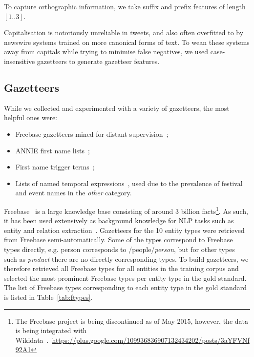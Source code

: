 \documentclass[11pt|a4paper]{article}
\begin{document}
To capture orthographic information, we take suffix and prefix features of length $[1..3]$.

Capitalisation is notoriously unreliable in tweets, and also often overfitted to by newswire systems trained on more canonical forms of text.
To wean these systems away from capitals while trying to minimise false negatives, we used case-insensitive gazetteers to generate gazetteer features.

\subsection{Gazetteers}
While we collected and experimented with a variety of gazetteers, the most helpful ones were:

\begin{itemize}
\item Freebase gazetteers mined for distant supervision~\cite{augenstein2014relation};
\item ANNIE first name lists~\cite{Cun02b-short};
\item First name trigger terms~\cite{derczynski2014passive};
\item Lists of named temporal expressions~\cite{brucato2013recognising}, used due to the prevalence of festival and event names in the {\em other} category.
\end{itemize}

Freebase~\cite{bollacker2008freebase} is a large knowledge base consisting of around 3 billion facts\footnote{The Freebase project is being discontinued as of May 2015, however, the data is being integrated with Wikidata~\cite{wikidata2014}.~\url{https://plus.google.com/109936836907132434202/posts/3aYFVNf92A1}}.
    As such, it has been used extensively as background knowledge for NLP tasks such as entity and relation extraction~\cite{augenstein2014relation}. Gazetteers for the 10 entity types were retrieved from Freebase semi-automatically. Some of the types correspond to Freebase types directly, e.g. person corresponds to /people/\textit{person}, but for other types such as \textit{product} there are no directly corresponding types. To build gazetteers, we therefore retrieved all Freebase types for all entities in the training corpus and selected the most prominent Freebase types per entity type in the gold standard. The list of Freebase types corresponding to each entity type in the gold standard is listed in Table~\ref{tab:ftypes}.
    
\end{document}
